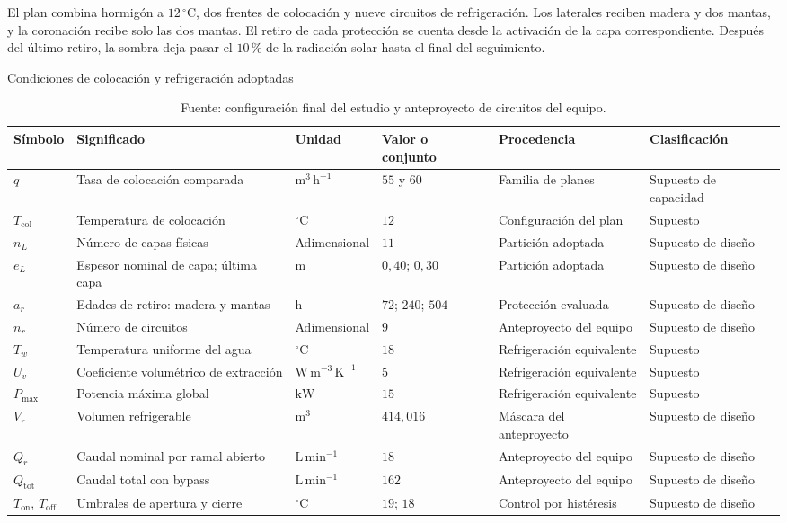 El plan combina hormigón a $12\,^\circ\mathrm C$, dos frentes de colocación y nueve circuitos de refrigeración. Los laterales reciben madera y dos mantas, y la coronación recibe solo las dos mantas. El retiro de cada protección se cuenta desde la activación de la capa correspondiente. Después del último retiro, la sombra deja pasar el $10\,\text{\%}$ de la radiación solar hasta el final del seguimiento.
\begin{table}[htbp]
  \centering
  \caption{Condiciones de colocación y refrigeración adoptadas}
  \label{tab:param-plan}
  \small
  \setlength{\tabcolsep}{4pt}
  \begin{tabular}{L{1.4cm}L{3.8cm}L{2.1cm}L{2.0cm}L{3.7cm}L{2.8cm}}
    \toprule
    Símbolo & Significado & Unidad & Valor o conjunto & Procedencia & Clasificación \\
    \midrule
    $q$ & Tasa de colocación comparada & $\mathrm{m^3\,h^{-1}}$ & $55$ y $60$ & Familia de planes & Supuesto de capacidad \\
    $T_{\mathrm{col}}$ & Temperatura de colocación & $^{\circ}\mathrm{C}$ & $12$ & Configuración del plan & Supuesto \\
    $n_L$ & Número de capas físicas & Adimensional & $11$ & Partición adoptada & Supuesto de diseño \\
    $e_L$ & Espesor nominal de capa; última capa & $\mathrm{m}$ & $0{,}40$; $0{,}30$ & Partición adoptada & Supuesto de diseño \\
    $a_r$ & Edades de retiro: madera y mantas & $\mathrm{h}$ & $72$; $240$; $504$ & Protección evaluada & Supuesto de diseño \\
    $n_r$ & Número de circuitos & Adimensional & $9$ & Anteproyecto del equipo & Supuesto de diseño \\
    $T_w$ & Temperatura uniforme del agua & $^{\circ}\mathrm{C}$ & $18$ & Refrigeración equivalente & Supuesto \\
    $U_v$ & Coeficiente volumétrico de extracción & $\mathrm{W\,m^{-3}\,K^{-1}}$ & $5$ & Refrigeración equivalente & Supuesto \\
    $P_{\max}$ & Potencia máxima global & $\mathrm{kW}$ & $15$ & Refrigeración equivalente & Supuesto \\
    $V_r$ & Volumen refrigerable & $\mathrm{m^3}$ & $414{,}016$ & Máscara del anteproyecto & Supuesto de diseño \\
    $Q_r$ & Caudal nominal por ramal abierto & $\mathrm{L\,min^{-1}}$ & $18$ & Anteproyecto del equipo & Supuesto de diseño \\
    $Q_{\mathrm{tot}}$ & Caudal total con bypass & $\mathrm{L\,min^{-1}}$ & $162$ & Anteproyecto del equipo & Supuesto de diseño \\
    $T_{\mathrm{on}}$, $T_{\mathrm{off}}$ & Umbrales de apertura y cierre & $^{\circ}\mathrm{C}$ & $19$; $18$ & Control por histéresis & Supuesto de diseño \\
    \bottomrule
  \end{tabular}
  \captionsetup{skip=2pt}
  \caption*{Fuente: configuración final del estudio y anteproyecto de circuitos del equipo.}
\end{table}


